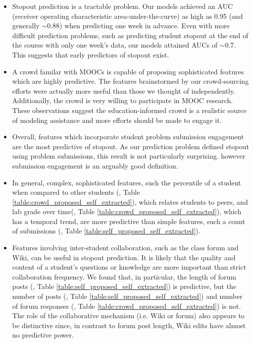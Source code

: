 \begin{itemize}
\item Stopout prediction is a tractable problem. Our models achieved an AUC (receiver operating characteristic area-under-the-curve) as high as 0.95 (and generally $\sim$0.88) when predicting one week in advance. Even with more difficult prediction problems, such as predicting student stopout at the end of the course with only one week's data, our models attained AUCs of $\sim$0.7. This suggests that early predictors of stopout exist.

\item A crowd familar with MOOCs is capable of proposing sophisticated features which are highly predictive. The features brainstormed by our crowd-sourcing efforts were actually more useful than those we thought of independently. Additionally, the crowd is very willing to participate in MOOC research. These observations suggest the education-informed crowd is a realistic source of modeling assistance and more efforts should be made to engage it.

\item Overall, features which incorporate student problem submission engagement are the most predictive of stopout. As our prediction problem defined stopout using problem submissions, this result is not particularly surprising. however submission engagement is an arguably good definition.

\item In general, complex, sophisticated features, such the percentile of a student when compared to other students (, Table \ref{table:crowd_proposed_self_extracted}), which relates students to peers, and lab grade over time(, Table \ref{table:crowd_proposed_self_extracted}), which has a temporal trend, are more predictive than simple features, such a count of submissions (, Table \ref{table:self_proposed_self_extracted}). 

\item Features involving inter-student collaboration, such as the class forum and Wiki, can be useful in stopout prediction. It is likely that the quality and content of a student's questions or knowledge are more important than strict collaboration frequency. We found that, in particular, the length of forum posts (, Table \ref{table:self_proposed_self_extracted}) is predictive, but the number of posts (, Table \ref{table:self_proposed_self_extracted}) and number of forum responses (, Table \ref{table:crowd_proposed_self_extracted}) is not. The role of the collaborative mechanism (i.e. Wiki or forum) also appears to be distinctive since, in contrast to forum post length, Wiki edits have almost no predictive power.


\end{itemize}
